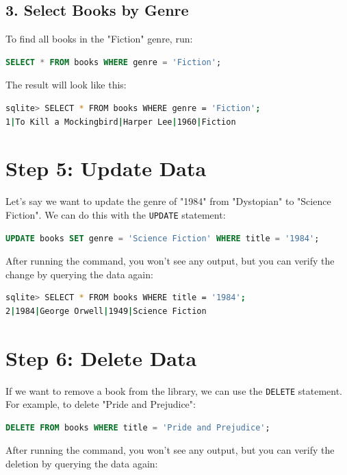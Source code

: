 \documentclass{article}
\begin{document}
\subsection*{3. Select Books by Genre}

To find all books in the "Fiction" genre, run:

\begin{lstlisting}[language=SQL]
SELECT * FROM books WHERE genre = 'Fiction';
\end{lstlisting}

The result will look like this:

\begin{lstlisting}[language=bash]
sqlite> SELECT * FROM books WHERE genre = 'Fiction';
1|To Kill a Mockingbird|Harper Lee|1960|Fiction
\end{lstlisting}

\section*{Step 5: Update Data}

Let's say we want to update the genre of "1984" from "Dystopian" to "Science Fiction". We can do this with the \texttt{UPDATE} statement:

\begin{lstlisting}[language=SQL]
UPDATE books SET genre = 'Science Fiction' WHERE title = '1984';
\end{lstlisting}

After running the command, you won't see any output, but you can verify the change by querying the data again:

\begin{lstlisting}[language=bash]
sqlite> SELECT * FROM books WHERE title = '1984';
2|1984|George Orwell|1949|Science Fiction
\end{lstlisting}

\section*{Step 6: Delete Data}

If we want to remove a book from the library, we can use the \texttt{DELETE} statement. For example, to delete "Pride and Prejudice":

\begin{lstlisting}[language=SQL]
DELETE FROM books WHERE title = 'Pride and Prejudice';
\end{lstlisting}

After running the command, you won't see any output, but you can verify the deletion by querying the data again:
\end{document}
